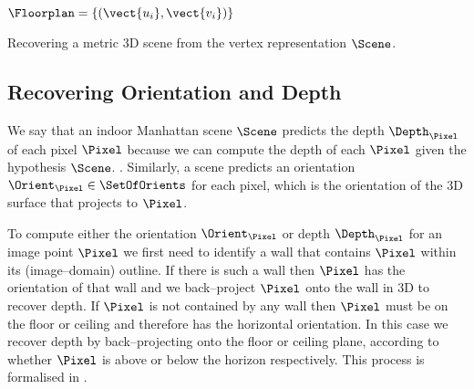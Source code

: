 \begin{algorithm}
  \begin{algorithmic}
    \ENSURE $\Floorplan=\{(\vect{u_i},\vect{v_i})\}$
    \STATE{$\Floorplan \leftarrow \emptyset$}
    \ENDFOR
  \end{algorithmic}
  \caption{\label{alg:scene-to-recon}
    Recovering a metric 3D scene from the vertex representation
    $\Scene$.}
\end{algorithm}

\subsection{Recovering Orientation and Depth}
We say that an indoor Manhattan scene $\Scene$ predicts the depth
$\Depth_{\Pixel}$ of each pixel $\Pixel$ because we can compute the
depth of each $\Pixel$ given the hypothesis $\Scene$. . Similarly, a
scene predicts an orientation $\Orient_{\Pixel}\in\SetOfOrients$ for
each pixel, which is the orientation of the 3D surface that
projects to $\Pixel$.

To compute either the orientation $\Orient_{\Pixel}$ or depth
$\Depth_{\Pixel}$ for an image point $\Pixel$ we first need to
identify a wall that contains $\Pixel$ within its (image--domain)
outline. If there is such a wall then $\Pixel$ has the orientation of
that wall and we back--project $\Pixel$ onto the wall in 3D to recover
depth. If $\Pixel$ is not contained by any wall then $\Pixel$ must be
on the floor or ceiling and therefore has the horizontal
orientation. In this case we recover depth by back--projecting onto
the floor or ceiling plane, according to whether $\Pixel$ is above or
below the horizon respectively. This process is formalised in
.

